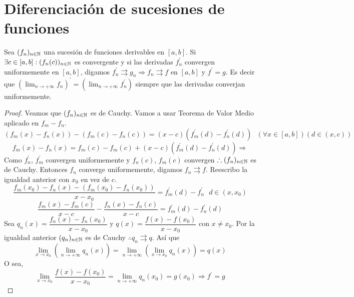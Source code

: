 \section{Diferenciación de sucesiones de funciones}

\begin{theorem}
  Sea $(f_n)_{n \in \mathbb{N}}$ una sucesión de funciones derivables en $[a, b]$. Si $\exists c \in [a, b] : (f_n(c))_{n \in \mathbb{N}}$ es convergente y si las derivadas $f_n^{\prime}$ convergen uniformemente en $[a, b]$, digamos $f_n^{\prime} \rightrightarrows g_n \Rightarrow f_n \rightrightarrows f$ en $[a, b]$ y $f^{\prime} = g$.
  Es decir que $(\lim_{n \to +\infty} f_n)^{\prime} = (\lim_{n \to +\infty} f_n^{\prime})$ siempre que las derivadas converjan uniformemente.
  \begin{proof}
    Veamos que $(f_n)_{n \in \mathbb{N}}$ es de Cauchy. Vamos a usar Teorema de Valor Medio aplicado en $f_m - f_n$. \begin{equation}
      (f_m(x) - f_n(x)) - (f_m(c) - f_n(c)) = (x-c)(f_m^{\prime}(d) - f_n^{\prime}(d)) \text{  } (\forall x \in [a, b])(d \in (x, c))
    \end{equation}
    \begin{equation}
      f_m(x) - f_n(x) = f_m(c) - f_m(c) + (x-c) (f_m^{\prime}(d) - f_n^{\prime}(d)) \Rightarrow
    \end{equation} Como $f_n^{\prime}$, $f_m^{\prime}$ convergen uniformemente y $f_n(c)$, $f_m(c)$ convergen $\therefore (f_n)_{n \in \mathbb{N}}$ es de Cauchy. Entonces $f_n$ converge uniformemente, digamos $f_n \rightrightarrows f$. Reescribo la igualdad anterior con $x_0$ en vez de $c$.
    \begin{equation}
      \dfrac{f_m(x_0) - f_n(x) - (f_m(x_0) - f_n(x_0))}{x - x_0} = f_m^{\prime}(d) - f_n^{\prime} \text{  } d \in (x, x_0)
    \end{equation}
    \begin{equation}
      \dfrac{f_m(x) - f_m(c)}{x - c} - \dfrac{f_n(x) - f_n(c)}{x - c} = f_m^{\prime}(d) - f_n^{\prime}(d)
    \end{equation}
    Sea $q_n(x) = \dfrac{f_n(x)-f_n(x_0)}{x-x_0}$ y $q(x) = \dfrac{f(x)-f(x_0)}{x - x_0}$ con $x \neq x_0$. Por la igualdad anterior $(q_n)_{n \in \mathbb{N}}$ es de Cauchy $\therefore q_n \rightrightarrows q$. Así que \begin{equation}
      \lim_{x \to x_0} (\lim_{n \to +\infty} q_n(x)) = \lim_{n \to +\infty}(\lim_{x \to x_0} q_n(x)) = q(x)
    \end{equation} O sea, \begin{equation}
      \lim_{x \to x_0} \dfrac{f(x) - f(x_0)}{x-x_0} = \lim_{n \to +\infty} q_n(x_0) = g(x_0) \Rightarrow f^{\prime} = g
    \end{equation} 
  \end{proof} 
\end{theorem}

